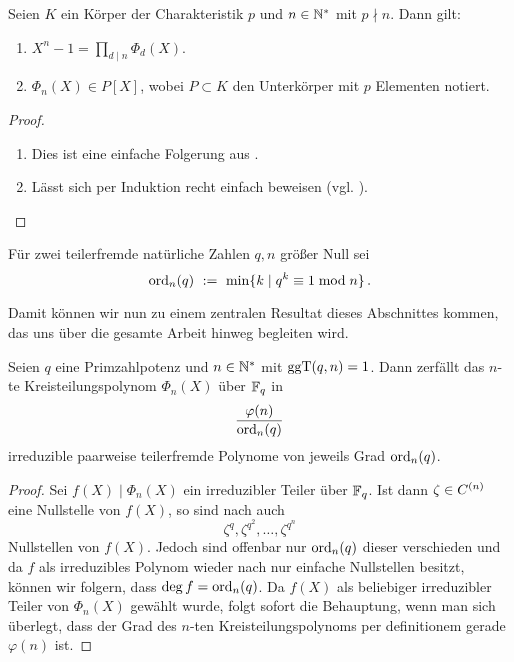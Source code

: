 \begin{satz}
  \label{satz:zerfall_xn-1}
  Seien $K$ ein Körper der Charakteristik $p$ und $n \in \mathbb{N}^\ast$ mit $p\nmid
  n$. Dann gilt:
  \begin{enumerate}
    \item $X^n-1 = \prod_{d\mid n} \Phi_d(X)$.
    \item $\Phi_n(X) \in P[X]$, wobei $P\subset K$ den Unterkörper mit $p$
      Elementen notiert.
  \end{enumerate}
\end{satz}
\begin{proof}
  \begin{enumerate}
    \item Dies ist eine einfache Folgerung aus .
    \item Lässt sich per Induktion recht einfach beweisen 
      (vgl. \autocite[Theorem 2.45 (ii)]{lidl1997finite}).
  \end{enumerate}
\end{proof}


\begin{definition}
  Für zwei teilerfremde natürliche Zahlen $q,n$ größer Null sei
  \[ \operatorname{ord}_n(q) \ :=\  \min\{k \mid q^k \equiv 1 \bmod n\}\,.\]
\end{definition}

Damit können wir nun zu einem zentralen Resultat dieses Abschnittes kommen, das
uns über die gesamte Arbeit hinweg begleiten wird.

\begin{satz}
  Seien $q$ eine Primzahlpotenz und $n\in \mathbb{N}^\ast$ mit $\operatorname{ggT}(q,n)=1$. Dann
  zerfällt das $n$-te Kreisteilungspolynom $\Phi_n(X)$ über $\mathbb{F}_q$ in
  \[ \frac{\varphi(n)}{\operatorname{ord}_n(q)}\]
  irreduzible paarweise teilerfremde Polynome von jeweils Grad $\operatorname{ord}_n(q)$.
\end{satz}
\begin{proof}
  Sei $f(X) \mid \Phi_n(X)$ ein irreduzibler Teiler über $\mathbb{F}_q$. Ist dann
  $\zeta \in C^{(n)}$ eine Nullstelle von $f(X)$, so sind 
  nach  auch
  \[ \zeta^q, \zeta^{q^2}, \ldots, \zeta^{q^n} \]
  Nullstellen von $f(X)$. Jedoch sind offenbar nur $\operatorname{ord}_n(q)$ dieser 
  verschieden und da $f$ als irreduzibles Polynom wieder nach 
   nur einfache Nullstellen besitzt,
  können wir folgern, dass $\deg f = \operatorname{ord}_n(q)$.
  Da $f(X)$ als beliebiger irreduzibler Teiler von $\Phi_n(X)$ gewählt wurde,
  folgt sofort die Behauptung, wenn man sich überlegt, dass der Grad des
  $n$-ten Kreisteilungspolynoms per definitionem gerade $\varphi(n)$ ist.
\end{proof}


